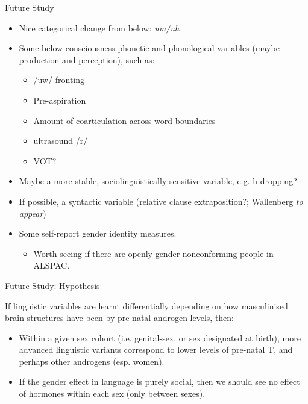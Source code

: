 \documentclass[hyperref={pdfpagelabels=false}]{beamer}
\begin{document}
\begin{frame}{Future Study}
\begin{itemize}
	
	\item Nice categorical change from below: \textsl{um/uh}
	\item Some below-consciousness phonetic and phonological variables (maybe production and perception), such as:
			\begin{itemize}
			\item /uw/-fronting
			\item Pre-aspiration
			\item Amount of coarticulation across word-boundaries
			\item ultrasound /r/
			\item VOT?
			
			\end{itemize}
	\item Maybe a more stable, sociolinguistically sensitive variable, e.g. h-dropping?
	\item If possible, a syntactic variable (relative clause extraposition?; Wallenberg \textsl{to appear})

	\item Some self-report gender identity measures.
		\begin{itemize}
			\item Worth seeing if there are openly gender-nonconforming people in ALSPAC.
		\end{itemize}
		\end{itemize}

\end{frame}


\begin{frame}{Future Study: Hypothesis}

\begin{center}
\item If linguistic variables are learnt differentially depending on how masculinised brain structures have been by pre-natal androgen levels, then:
\end{center} 
\begin{itemize}
	\item Within a given sex cohort (i.e. genital-sex, or sex designated at birth), more advanced linguistic variants correspond to lower levels of pre-natal T, and perhaps other androgens (esp. women).
	\item If the gender effect in language is purely social, then we should see no effect of hormones within each sex (only between sexes).
\end{itemize}
\end{frame}
\end{document}
